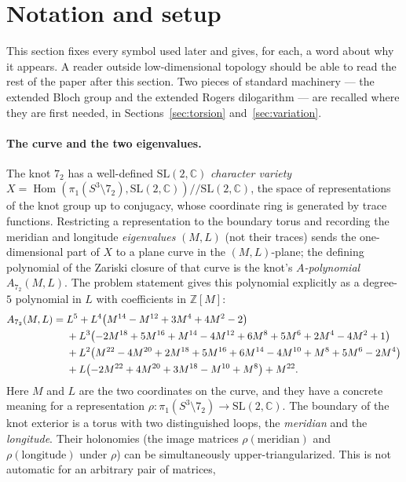 \documentclass[11pt]{article}
\theoremstyle{definition}
\newcommand{\C}{\mathbb{C}}
\newcommand{\Z}{\mathbb{Z}}
\newcommand{\SL}{\mathrm{SL}}
\begin{document}
\section{Notation and setup}\label{sec:notation}

This section fixes every symbol used later and gives, for each, a word about
why it appears.  A reader outside low-dimensional topology should be able to
read the rest of the paper after this section.  Two pieces of standard
machinery --- the extended Bloch group and the extended Rogers dilogarithm ---
are recalled where they are first needed, in Sections~\ref{sec:torsion}
and~\ref{sec:variation}.

\paragraph{The curve and the two eigenvalues.}
The knot $7_2$ has a well-defined $\SL(2,\C)$ \emph{character variety}
$X=\operatorname{Hom}(\pi_1(S^3\setminus 7_2),\SL(2,\C))/\!/\SL(2,\C)$, the space of
representations of the knot group up to conjugacy, whose coordinate ring is
generated by trace functions.  Restricting a representation to the boundary
torus and recording the meridian and longitude \emph{eigenvalues} $(M,L)$ (not
their traces) sends the one-dimensional part of $X$ to a plane curve in the
$(M,L)$-plane; the defining polynomial of the Zariski closure of that curve is
the knot's \emph{$A$-polynomial} $A_{7_2}(M,L)$.  The problem statement gives this polynomial explicitly as a
degree-$5$ polynomial in $L$ with coefficients in $\Z[M]$:
\begin{align}
 A_{7_2}(M,L)={}& L^5
 + L^4\bigl(M^{14}-M^{12}+3M^4+4M^2-2\bigr)\notag\\
 &{}+ L^3\bigl(-2M^{18}+5M^{16}+M^{14}-4M^{12}+6M^8+5M^6+2M^4-4M^2+1\bigr)\notag\\
 &{}+ L^2\bigl(M^{22}-4M^{20}+2M^{18}+5M^{16}+6M^{14}-4M^{10}+M^8+5M^6-2M^4\bigr)\notag\\
 &{}+ L\bigl(-2M^{22}+4M^{20}+3M^{18}-M^{10}+M^8\bigr)
 + M^{22}.\label{eq:Apoly}
\end{align}
Here $M$ and $L$ are the two coordinates on the curve, and they have a concrete
meaning for a representation $\rho\colon\pi_1(S^3\setminus 7_2)\to\SL(2,\C)$.
The boundary of the knot exterior is a torus with two distinguished loops, the
\emph{meridian} and the \emph{longitude}.  Their holonomies (the image matrices $\rho(\text{meridian})$
and $\rho(\text{longitude})$ under $\rho$) can be simultaneously
upper-triangularized.  This is not automatic for an arbitrary pair of matrices,
\end{document}
